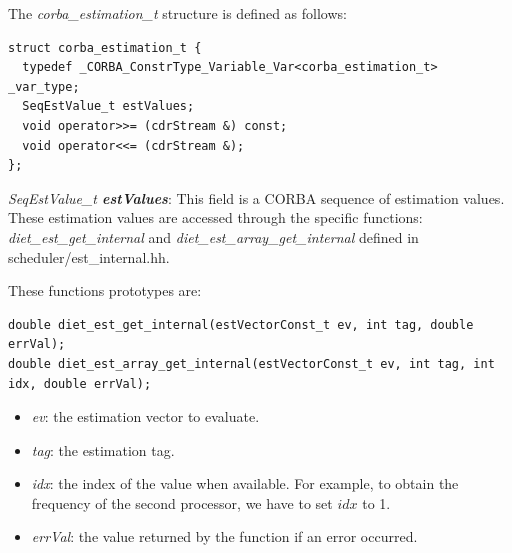 \noindent The \textit{corba\_estimation\_t} structure is defined as follows:
\begin{verbatim}
struct corba_estimation_t {
  typedef _CORBA_ConstrType_Variable_Var<corba_estimation_t> _var_type;
  SeqEstValue_t estValues;
  void operator>>= (cdrStream &) const;
  void operator<<= (cdrStream &);
};
\end{verbatim}
\textit{SeqEstValue\_t \bf estValues}: This field is a CORBA sequence of
estimation values. These estimation values are accessed through the specific
functions: \textit{diet\_est\_get\_internal} and
\textit{diet\_est\_array\_get\_internal} defined in scheduler/est\_internal.hh.

\noindent These functions prototypes are:
\begin{verbatim}
double diet_est_get_internal(estVectorConst_t ev, int tag, double errVal);
double diet_est_array_get_internal(estVectorConst_t ev, int tag, int idx, double errVal);
\end{verbatim}
\begin{itemize}
  \item \textit{ev}: the estimation vector to evaluate.
  \item \textit{tag}: the estimation tag.
  \item \textit{idx}: the index of the value when available. For example, to
    obtain the frequency of the second processor, we have to set $idx$ to 1.
  \item \textit{errVal}: the value returned by the function if an error
    occurred.
\end{itemize}


